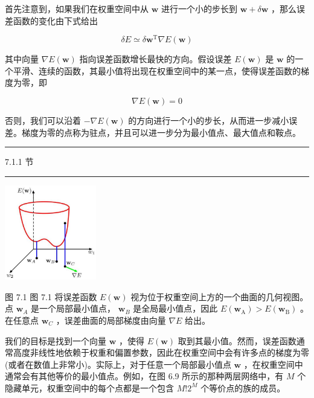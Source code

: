 \documentclass[10pt]{report}
\newcommand{\HRule}{\begin{center}\rule{0.9\linewidth}{0.2mm}\end{center}}
\begin{document}
首先注意到，如果我们在权重空间中从 \(\mathbf{w}\) 进行一个小的步长到 \(\mathbf{w} + \delta \mathbf{w}\) ，那么误差函数的变化由下式给出

\[
{\delta E} \simeq  \delta {\mathbf{w}}^{\mathrm{T}}\nabla E\left( \mathbf{w}\right)  \tag{7.1}
\]

其中向量 \(\nabla E\left( \mathbf{w}\right)\) 指向误差函数增长最快的方向。假设误差 \(E\left( \mathbf{w}\right)\) 是 \(\mathbf{w}\) 的一个平滑、连续的函数，其最小值将出现在权重空间中的某一点，使得误差函数的梯度为零，即

\[
\nabla E\left( \mathbf{w}\right)  = 0 \tag{7.2}
\]

否则，我们可以沿着 \(- \nabla E\left( \mathbf{w}\right)\) 的方向进行一个小的步长，从而进一步减小误差。梯度为零的点称为驻点，并且可以进一步分为最小值点、最大值点和鞍点。

\HRule

7.1.1 节

\HRule

\begin{center}
\includegraphics[max width=0.3\textwidth]{images/0194e279-9b28-703a-88f4-c3ac21e2010d_230_1074_344_470_486_0.jpg}
\end{center}
\hspace*{3em} 

图 7.1 图 7.1 将误差函数 \(E\left( \mathbf{w}\right)\) 视为位于权重空间上方的一个曲面的几何视图。点 \({\mathbf{w}}_{A}\) 是一个局部最小值点， \({\mathbf{w}}_{B}\) 是全局最小值点，因此 \(E\left( {\mathbf{w}}_{\mathrm{A}}\right)  > E\left( {\mathbf{w}}_{\mathrm{B}}\right)\) 。在任意点 \({\mathbf{w}}_{C}\) ，误差曲面的局部梯度由向量 \(\nabla E\) 给出。

我们的目标是找到一个向量 \(\mathbf{w}\) ，使得 \(E\left( \mathbf{w}\right)\) 取到其最小值。然而，误差函数通常高度非线性地依赖于权重和偏置参数，因此在权重空间中会有许多点的梯度为零(或者在数值上非常小)。实际上，对于任意一个局部最小值点 \(\mathbf{w}\) ，在权重空间中通常会有其他等价的最小值点。例如，在图 6.9 所示的那种两层网络中，有 \(M\) 个隐藏单元，权重空间中的每个点都是一个包含 \(M!{2}^{M}\) 个等价点的族的成员。
\end{document}
